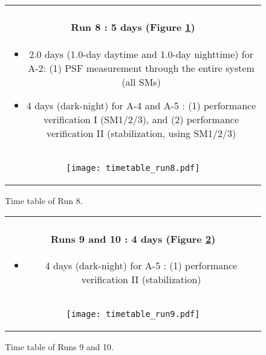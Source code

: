 \begin{figure}[!ht]
\begin{center}
\begin{tabular}{c}
\begin{minipage}{0.95\hsize}
\paragraph{Run 8 : 5 days  (Figure \ref{fig:run8})}
	\begin{itemize}
	\item 2.0 days (1.0-day daytime and 1.0-day nighttime) for A-2: 
	(1) PSF measurement through the entire system (all SMs)
	\item 4 days (dark-night) for A-4 and A-5 : 
	(1) performance verification I (SM1/2/3),  and
	(2) performance verification II (stabilization, using SM1/2/3)
	\end{itemize}
\end{minipage} \\
\begin{minipage}{0.8\hsize}
	\begin{center}
	\vspace*{5mm}
	\texttt{[image: timetable\_run8.pdf]}
	\end{center}
	\vspace*{-5mm}
	\caption{Time table of Run 8.}
	\label{fig:run8}
\end{minipage}
\end{tabular}
\end{center}
\end{figure}

\begin{figure}[!ht]
\begin{center}
\begin{tabular}{c}
\begin{minipage}{0.95\hsize}
\paragraph{Runs 9 and 10 : 4 days  (Figure \ref{fig:run9})}
	\begin{itemize}
	\item 4 days (dark-night) for A-5 :
	(1) performance verification II (stabilization)
	\end{itemize}
\end{minipage} \\
\begin{minipage}{0.8\hsize}
	\begin{center}
	\vspace*{5mm}
	\texttt{[image: timetable\_run9.pdf]}
	\end{center}
	\vspace*{-5mm}
	\caption{Time table of Runs 9 and 10.}
	\label{fig:run9}
\end{minipage}
\end{tabular}
\end{center}
\end{figure}


